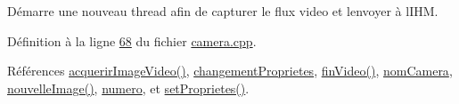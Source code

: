 Démarre une nouveau thread afin de capturer le flux video et l\textquotesingle{}envoyer à l\textquotesingle{}I\+HM. 



Définition à la ligne \hyperlink{camera_8cpp_source_l00068}{68} du fichier \hyperlink{camera_8cpp_source}{camera.\+cpp}.



Références \hyperlink{camera_8cpp_source_l00063}{acquerir\+Image\+Video()}, \hyperlink{camera_8h_source_l00070}{changement\+Proprietes}, \hyperlink{class_camera_a4c560c4add60ebce65e2d9717e3d668c}{fin\+Video()}, \hyperlink{camera_8h_source_l00063}{nom\+Camera}, \hyperlink{class_camera_a38c810d466375e950401e483f885c52f}{nouvelle\+Image()}, \hyperlink{camera_8h_source_l00064}{numero}, et \hyperlink{camera_8cpp_source_l00108}{set\+Proprietes()}.



